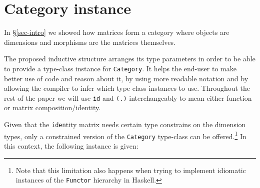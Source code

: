 \documentclass[sigplan,screen]{acmart}\settopmatter{}
\newcommand{\hs}{\texttt}
\begin{document}
%
%
%

\section{Category instance}\label{sec:cat}

In \S\ref{sec-intro} we showed how matrices form a category where objects are dimensions and morphisms are the matrices themselves.

The proposed inductive structure arranges its type parameters in order to be able to provide a type-class instance for \hs{Category}. It helps the end-user to make better use of code and reason about it, by using more readable notation and by allowing the compiler to infer which type-class instances to use. Throughout the rest of the paper we will use \hs{id} and \hs{(.)} interchangeably to mean either function or matrix composition/identity.

Given that the \hs{iden}tity matrix needs certain type constrains on the dimension types, only a constrained version of the \hs{Category} type-class can be offered.\footnote{Note that this limitation also happens when trying to implement idiomatic instances of the \hs{Functor} hierarchy in Haskell.
} In this context, the following instance is given:
\end{document}
